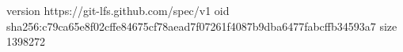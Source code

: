 version https://git-lfs.github.com/spec/v1
oid sha256:c79ca65e8f02cffe84675cf78aead7f07261f4087b9dba6477fabcffb34593a7
size 1398272
